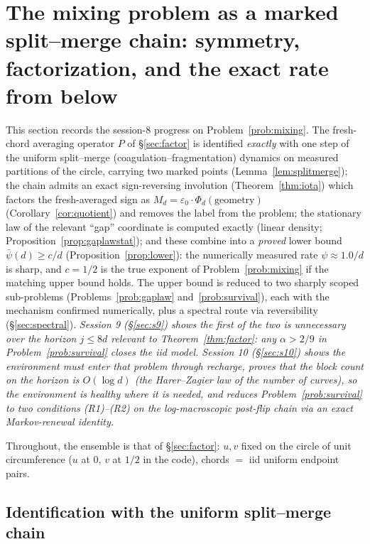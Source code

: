 \section{The mixing problem as a marked split--merge chain: symmetry,
factorization, and the exact rate from below}
\label{sec:mixing}

This section records the session-8 progress on
Problem~\ref{prob:mixing}.  The fresh-chord averaging operator $P$ of
\S\ref{sec:factor} is identified \emph{exactly} with one step of the
uniform split--merge (coagulation--fragmentation) dynamics on measured
partitions of the circle, carrying two marked points
(Lemma~\ref{lem:splitmerge}); the chain admits an exact sign-reversing
involution (Theorem~\ref{thm:iota}) which factors the fresh-averaged
sign as $M_d=\varepsilon_0\cdot\Phi_d(\text{geometry})$
(Corollary~\ref{cor:quotient}) and removes the label from the problem;
the stationary law of the relevant ``gap'' coordinate is computed
exactly (linear density; Proposition~\ref{prop:gaplawstat}); and these
combine into a \emph{proved} lower bound
$\bar\psi(d)\ge c/d$ (Proposition~\ref{prop:lower}): the numerically
measured rate $\psi\approx1.0/d$ is sharp, and $c=1/2$ is the true
exponent of Problem~\ref{prob:mixing} if the matching upper bound
holds.  The upper bound is reduced to two sharply scoped sub-problems
(Problems~\ref{prob:gaplaw} and~\ref{prob:survival}), each with the
mechanism confirmed numerically, plus a spectral route via
reversibility (\S\ref{sec:spectral}).  \emph{Session 9
(\S\ref{sec:s9}) shows the first of the two is unnecessary over the
horizon $j\le8d$ relevant to Theorem~\ref{thm:factor}: any
$\alpha>2/9$ in Problem~\ref{prob:survival} closes the iid model.
Session 10 (\S\ref{sec:s10}) shows the environment must enter that
problem through recharge, proves that the block count on the horizon is
$O(\log d)$ (the Harer--Zagier law of the number of curves), so the
environment is healthy where it is needed, and reduces
Problem~\ref{prob:survival} to two conditions (R1)--(R2) on the
log-macroscopic post-flip chain via an exact Markov-renewal identity.}

Throughout, the ensemble is that of \S\ref{sec:factor}: $u,v$ fixed on
the circle of unit circumference ($u$ at $0$, $v$ at $1/2$ in the
code), chords $=$ iid uniform endpoint pairs.

\subsection{Identification with the uniform split--merge chain}
\label{sec:smident}

